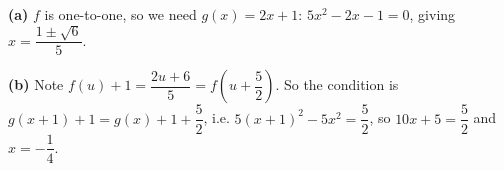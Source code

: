 \textbf{(a)} $f$ is one-to-one, so we need $g(x)=2x+1$: $5x^2-2x-1=0$, giving $x=\boxed{\dfrac{1\pm\sqrt6}{5}}$.

\textbf{(b)} Note $f(u)+1=\dfrac{2u+6}{5}=f\left(u+\dfrac52\right)$. So the condition is $g(x+1)+1=g(x)+1+\dfrac52$, i.e. $5(x+1)^2-5x^2=\dfrac52$, so $10x+5=\dfrac52$ and $x=\boxed{-\dfrac14}$.

